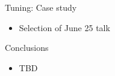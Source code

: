 \documentclass[10pt,t]{beamer}
\begin{document}
\begin{frame}{Tuning: Case study}

  \begin{block}{}
  \end{block}

  \begin{itemize}
  \item Selection of June 25 talk
  \end{itemize}

\end{frame}
\begin{frame}{Conclusions}

  \begin{block}{}
  \end{block}

  \begin{itemize}
  \item TBD
  \end{itemize}

\end{frame}
\end{document}
